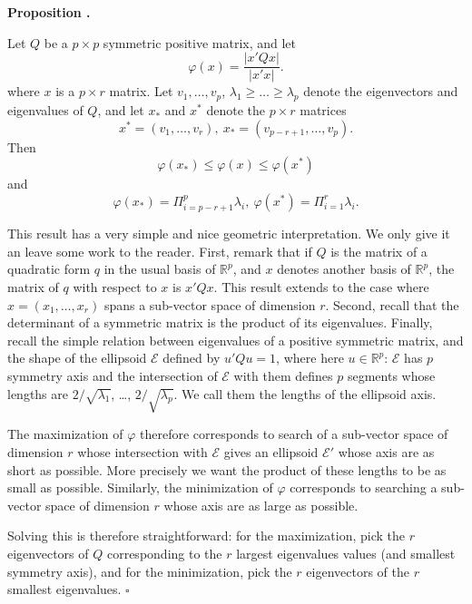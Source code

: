 \documentclass[12pt, leqno]{article}
\renewcommand{\det}[1]{|#1|}
\newcommand{\real}{\mathbb{R}}
\newcounter{prop}
\renewcommand{\theprop}{\arabic{prop}}
\newenvironment{prop}[0]%
{\refstepcounter{prop}\vspace{10pt}\par\noindent 
{\bf Proposition \theprop.}
\begin{itshape}}%
{\end{itshape}\par\vspace{0.2cm}}
\newcounter{ex}
\newcounter{rem}
\newenvironment{skproof}{\noindent {\em Sketch of proof. }}%
{$\square$ \par \vspace{10pt} \noindent}
\begin{document}
\begin{prop}
Let $Q$ be a $p \times p$ symmetric positive matrix, and let 
$$
\varphi(x) = \frac{\det{x' Q x}}{\det{x' x}}. 
$$
where $x$ is a $p \times r$ matrix. Let $v_1, \ldots, v_p$, $\lambda_1\geq \ldots \geq \lambda_p$
denote the eigenvectors and eigenvalues of $Q$, and let $x_*$ and $x^*$ denote the $p\times r$
matrices 
$$
x^* = \left( v_1,\ldots, v_r \right), \ x_* = \left( v_{p-r+1}, \ldots, v_p \right).
$$
Then
$$
\varphi(x_*) \leq \varphi(x) \leq \varphi (x^*)
$$
and
$$
\varphi(x_*) = \Pi_{i=p-r+1}^p \lambda_i, \ \varphi(x^*) = \Pi_{i=1}^r \lambda_i. 
$$
\end{prop}
\begin{skproof}
This result has a very simple and nice geometric interpretation. We only give it 
an leave some work to the reader. First, remark that if $Q$ is the matrix 
of a quadratic form $q$ in the usual basis of $\real^p$, and $x$ denotes another 
basis of $\real^p$, the matrix of $q$ with respect to $x$ is $x'Qx$. 
This result extends to the case where $x=(x_1,\ldots, x_r)$ spans a sub-vector space
of dimension $r$. Second, recall
that the determinant of a symmetric matrix is the product of its eigenvalues. Finally, 
recall the simple relation between eigenvalues of a positive symmetric matrix,
and the shape of the ellipsoid $\mathcal E$ defined by $u'Qu=1$, where here $u\in \real^p$: 
$\mathcal E$ has $p$ symmetry axis and the intersection of $\mathcal E$ 
with them defines $p$ segments whose lengths are $2/\sqrt{\lambda_1}$,
\ldots, $2/\sqrt{\lambda_p}$. We call them the lengths of the ellipsoid axis.

The maximization of $\varphi$ therefore corresponds to search of a sub-vector
space of dimension $r$ whose intersection with $\mathcal E$ gives an ellipsoid $\mathcal E'$
whose axis are as short as possible. More precisely we want the product of these lengths to be
as small as possible. Similarly, the minimization of $\varphi$ corresponds to searching 
a sub-vector space of dimension $r$ whose axis are as large as possible.

Solving this is therefore straightforward: for the maximization, pick the $r$ eigenvectors
of $Q$ corresponding to the $r$ largest eigenvalues values (and smallest symmetry axis), and for 
the minimization, pick the $r$ eigenvectors of the $r$ smallest eigenvalues.
\end{skproof}
\end{document}
